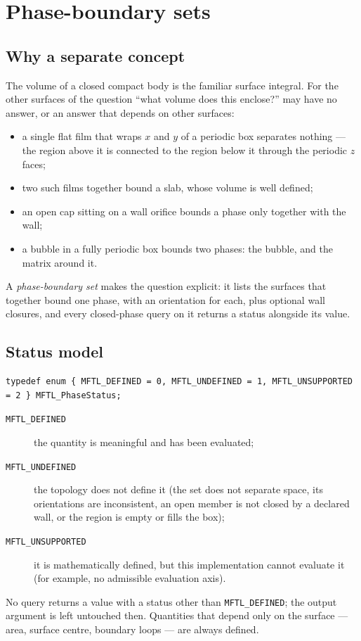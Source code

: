 \chapter{Phase-boundary sets}
\label{ch:phasesets}

\section{Why a separate concept}

The volume of a closed compact body is the familiar surface integral. For the other surfaces
of \mftl{} the question ``what volume does this enclose?'' may have no answer, or an answer that
depends on other surfaces:
\begin{itemize}
  \item a single flat film that wraps $x$ and $y$ of a periodic box separates nothing --- the
    region above it is connected to the region below it through the periodic $z$ faces;
  \item two such films together bound a slab, whose volume is well defined;
  \item an open cap sitting on a wall orifice bounds a phase only together with the wall;
  \item a bubble in a fully periodic box bounds two phases: the bubble, and the matrix around it.
\end{itemize}
A \emph{phase-boundary set} makes the question explicit: it lists the surfaces that together
bound one phase, with an orientation for each, plus optional wall closures, and every
closed-phase query on it returns a status alongside its value.

\section{Status model}

\begin{lstlisting}[numbers=none]
typedef enum { MFTL_DEFINED = 0, MFTL_UNDEFINED = 1, MFTL_UNSUPPORTED = 2 } MFTL_PhaseStatus;
\end{lstlisting}
\begin{description}
  \item[\texttt{MFTL\_DEFINED}] the quantity is meaningful and has been evaluated;
  \item[\texttt{MFTL\_UNDEFINED}] the topology does not define it (the set does not separate
    space, its orientations are inconsistent, an open member is not closed by a declared wall, or
    the region is empty or fills the box);
  \item[\texttt{MFTL\_UNSUPPORTED}] it is mathematically defined, but this implementation cannot
    evaluate it (for example, no admissible evaluation axis).
\end{description}
No query returns a value with a status other than \texttt{MFTL\_DEFINED}; the output argument is
left untouched then. Quantities that depend only on the surface --- area, surface centre, boundary
loops --- are always defined.

